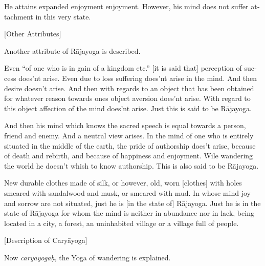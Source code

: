 \begin{otherlanguage}{english}
\begin{tlate}
    \end{tlate}
\begin{tlate}
  He attains expanded enjoyment enjoyment. However, his mind does not suffer attachment in this very state.     
    \end{tlate}
    \bigskip
    \centerline{\textrm{\small{[Other Attributes]}}}
    \bigskip
  \begin{tlate}
    Another attribute of Rājayoga is described.
    \end{tlate}
    \begin{tlate}
     Even ``of one who is in gain of a kingdom etc.'' [it is said that] perception of success does'nt arise. Even due to loss suffering does'nt arise in the mind. And then desire doesn't arise. And then with regards to an object that has been obtained for whatever reason towards ones object aversion does'nt arise. With regard to this object affection of the mind does'nt arise. Just this is said to be Rājayoga. \\
    \end{tlate}
    \begin{tlate}
    And then his mind which knows the sacred speech is equal towards a person, friend and enemy. And a neutral view arises. In the mind of one who is entirely situated in the middle of the earth, the pride of authorship does't arise, because of death and rebirth, and because of happiness and enjoyment. Wile wandering the world he doesn't whish to know authorship. This is also said to be Rājayoga.
    \end{tlate}
  \begin{tlate}
    New durable clothes made of silk, or however, old, worn [clothes] with holes smeared with sandalwood and musk, or smeared with mud. In whose mind joy and sorrow are not situated, just he is [in the state of] Rājayoga. Just he is in the state of Rājayoga for whom the mind is neither in abundance nor in lack, being located in a city, a forest, an uninhabited village or a village full of people.    
  \end{tlate}
      \bigskip
    \centerline{\textrm{\small{[Description of Caryāyoga]}}}
      \bigskip
     \begin{tlate}
        Now \textit{caryāyogaḥ}, the Yoga of wandering is explained.
    \end{tlate}

\end{otherlanguage}
